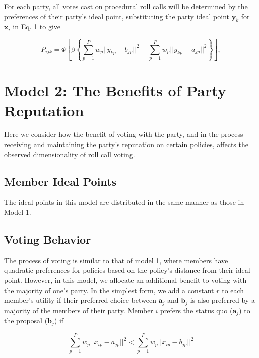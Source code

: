 \documentclass[12pt]{article}
\begin{document}
For each party, all votes cast on procedural roll calls will be determined by the preferences of their party's ideal point, substituting the party ideal point $\boldsymbol{y}_k$  for $\boldsymbol{x}_i$ in Eq. 1 to give

\begin{equation}
    P_{ijk} = \Phi \left[ \beta \left\lbrace \sum_{p=1}^{P}{w_p||y_{kp} - b_{jp}||^2} - \sum_{p=1}^{P}{w_p||y_{kp} - a_{jp}||^2} \right\rbrace \right],
\end{equation}

\section*{Model 2: The Benefits of Party Reputation}

Here we consider how the benefit of voting with the party, and in the process receiving and maintaining the party's reputation on certain policies, affects the observed dimensionality of roll call voting.

\subsection*{Member Ideal Points}

The ideal points in this model are distributed in the same manner as those in Model 1.

\subsection*{Voting Behavior}

The process of voting is similar to that of model 1, where members have quadratic preferences for policies based on the policy's distance from their ideal point. However, in this model, we allocate an additional benefit to voting with the majority of one's party. In the simplest form, we add a constant $r$ to each member's utility if their preferred choice between $\boldsymbol{a}_j$ and $\boldsymbol{b}_j$ is also preferred by a majority of the members of their party. Member $i$ prefers the status quo ($\boldsymbol{a}_j$) to the proposal ($\boldsymbol{b}_j$) if 

\begin{equation}
\sum_{p=1}^{P}{w_p||x_{ip} - a_{jp}||^2} < \sum_{p=1}^{P}{w_p||x_{ip} - b_{jp}||^2}
\end{equation}

\vspace{2mm}
\noindent
\end{document}
